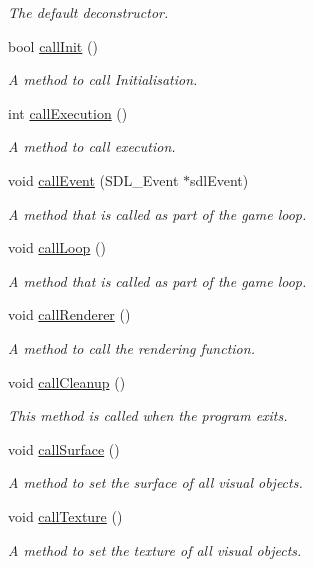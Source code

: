 \begin{DoxyCompactItemize}
\begin{DoxyCompactList}\small\item\em The default deconstructor. \end{DoxyCompactList}\item 
bool \hyperlink{class_application_afabe70d81db4451db19d267b3e47953c}{call\+Init} ()
\begin{DoxyCompactList}\small\item\em A method to call Initialisation. \end{DoxyCompactList}\item 
int \hyperlink{class_application_aae6cea757aa072af2b04f80f0dc43035}{call\+Execution} ()
\begin{DoxyCompactList}\small\item\em A method to call execution. \end{DoxyCompactList}\item 
void \hyperlink{class_application_a120691d97bf8c56542863cfb629c5334}{call\+Event} (S\+D\+L\+\_\+\+Event $\ast$sdl\+Event)
\begin{DoxyCompactList}\small\item\em A method that is called as part of the game loop. \end{DoxyCompactList}\item 
void \hyperlink{class_application_ac45e87c4784cb82521166105137147ee}{call\+Loop} ()
\begin{DoxyCompactList}\small\item\em A method that is called as part of the game loop. \end{DoxyCompactList}\item 
void \hyperlink{class_application_a8164c003d80f4ac88300a3b972abf259}{call\+Renderer} ()
\begin{DoxyCompactList}\small\item\em A method to call the rendering function. \end{DoxyCompactList}\item 
void \hyperlink{class_application_aa85cb7c4c0ba25070aa3320618b04821}{call\+Cleanup} ()
\begin{DoxyCompactList}\small\item\em This method is called when the program exits. \end{DoxyCompactList}\item 
void \hyperlink{class_application_a2d00469b8187f560ba9ff8574a1e2477}{call\+Surface} ()
\begin{DoxyCompactList}\small\item\em A method to set the surface of all visual objects. \end{DoxyCompactList}\item 
void \hyperlink{class_application_a185d7edc1ca8c5f9ca86fd927a486848}{call\+Texture} ()
\begin{DoxyCompactList}\small\item\em A method to set the texture of all visual objects. \end{DoxyCompactList}\end{DoxyCompactItemize}
